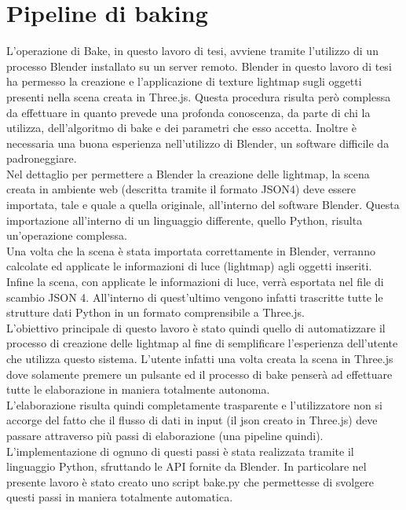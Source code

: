 \section{Pipeline di baking}
\label{sec:chapter_baking_service_pipeline_baking}
L’operazione di Bake, in questo lavoro di tesi, avviene tramite l’utilizzo di un processo Blender installato su un server remoto. Blender in questo lavoro di tesi ha permesso la creazione e l’applicazione di texture lightmap sugli oggetti presenti nella scena creata in Three.js.
Questa procedura risulta però complessa da effettuare in quanto prevede una profonda conoscenza, da parte di chi la utilizza, dell’algoritmo di bake e dei parametri che esso accetta. Inoltre è necessaria una buona esperienza nell’utilizzo di Blender, un software difficile da padroneggiare.
\\
Nel dettaglio per permettere a Blender la creazione delle lightmap, la scena creata in ambiente web (descritta tramite il formato JSON4) deve essere importata, tale e quale a quella originale, all’interno del software Blender. Questa importazione all’interno di un linguaggio differente, quello Python, risulta un’operazione complessa.
\\
Una volta che la scena è stata importata correttamente in Blender, verranno calcolate ed applicate le informazioni di luce (lightmap) agli oggetti inseriti. 
Infine la scena, con applicate le informazioni di luce, verrà esportata nel file di scambio JSON 4. All’interno di quest’ultimo vengono infatti trascritte tutte le strutture dati Python in un formato comprensibile a Three.js.
\\
L’obiettivo principale di questo lavoro è stato quindi quello di automatizzare il processo di creazione delle lightmap al fine di semplificare l’esperienza dell’utente che utilizza questo sistema. L’utente infatti una volta creata la scena in Three.js dove solamente premere un pulsante ed il processo di bake penserà ad effettuare tutte le elaborazione in maniera totalmente autonoma.
\\
L’elaborazione risulta quindi completamente trasparente e l’utilizzatore non si accorge del fatto che il flusso di dati in input (il json creato in Three.js) deve passare attraverso più passi di elaborazione (una pipeline quindi).
L’implementazione di ognuno di questi passi è stata realizzata tramite il linguaggio Python, sfruttando le API fornite da Blender.
In particolare nel presente lavoro è stato creato uno script bake.py che permettesse di svolgere questi passi in maniera totalmente automatica.
\\
